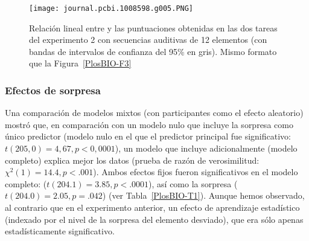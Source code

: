 \begin{figure}[t!]
   \texttt{[image: journal.pcbi.1008598.g005.PNG]}
   \centering
   \caption{Relación lineal entre \mdlbin y las puntuaciones obtenidas en las dos tareas del experimento 2 con secuencias auditivas de 12 elementos (con bandas de intervalos de confianza del 95\% en gris). Mismo formato que la Figura~\ref{PlosBIO-F3}}
   \label{PlosBIO-F5}
\end{figure}

\subsubsection*{Efectos de sorpresa}

Una comparación de modelos mixtos (con participantes como el efecto aleatorio)  mostró que, en comparación con un modelo nulo que incluye la sorpresa como único predictor (modelo nulo en el que el predictor principal fue significativo: $t (205,0) = 4,67, p <0,0001$), un modelo que incluye adicionalmente \mdlbin (modelo completo) explica mejor los datos (prueba de razón de verosimilitud: $\chi^2(1) = 14.4, p < .001$). Ambos efectos fijos fueron significativos en el modelo completo: \mdlbin ($t (204.1) = 3.85, p < .0001$), así como la sorpresa ($t (204.0) = 2.05, p= .042$) (ver Tabla~\ref{PlosBIO-T1}). Aunque hemos observado, al contrario que en el experimento anterior, un efecto de aprendizaje estadístico (indexado por el nivel de la sorpresa del elemento desviado), que era sólo apenas estadísticamente significativo.

